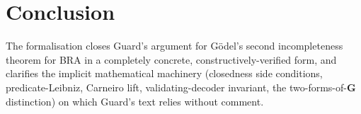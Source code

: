 \documentclass[11pt]{article}
\theoremstyle{plain}
\theoremstyle{definition}
\theoremstyle{remark}
\begin{document}
\section{Conclusion}

The formalisation closes Guard's argument for G\"odel's second
incompleteness theorem for BRA in a completely concrete,
constructively-verified form, and clarifies the implicit mathematical
machinery (closedness side conditions, predicate-Leibniz, Carneiro lift,
validating-decoder invariant, the two-forms-of-$\mathbf{G}$ distinction) on
which Guard's text relies without comment.




\end{document}
